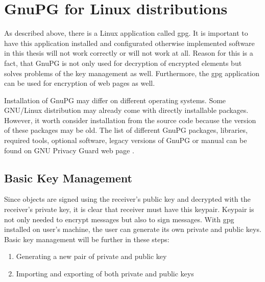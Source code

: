\section{GnuPG for Linux distributions}
As described above, there is a Linux application called gpg. It is important to have this application installed and configurated otherwise implemented software in this thesis will not work correctly or will not work at all. Reason for this is a fact, that GnuPG is not only used for decryption of encrypted elements but solves problems of the key management as well. Furthermore, the gpg application can be used for encryption of web pages as well.

Installation of GnuPG may differ on different operating systems. Some GNU/Linux distribution may already come with directly installable packages. However, it worth consider installation from the source code because the version of these packages may be old. The list of different GnuPG packages, libraries, required tools, optional software, legacy versions of GnuPG or manual can be found on GNU Privacy Guard web page \cite{GnuPG}.

\subsection{Basic Key Management}
Since objects are signed using the receiver's public key and decrypted with the receiver's private key, it is clear that receiver must have this keypair. Keypair is not only needed to encrypt messages but also to sign messages. With gpg installed on user's machine, the user can generate its own private and public keys. Basic key management will be further in these steps:
\begin{enumerate}
    \item Generating a new pair of private and public key
    \item Importing and exporting of both private and public keys
\end{enumerate}


